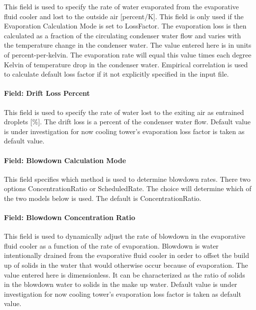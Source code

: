 This field is used to specify the rate of water evaporated from the evaporative fluid cooler and lost to the outside air {[}percent/K{]}. This field is only used if the Evaporation Calculation Mode is set to LossFactor. The evaporation loss is then calculated as a fraction of the circulating condenser water flow and varies with the temperature change in the condenser water. The value entered here is in units of percent-per-kelvin. The evaporation rate will equal this value times each degree Kelvin of temperature drop in the condenser water. Empirical correlation is used to calculate default loss factor if it not explicitly specified in the input file.

\paragraph{Field: Drift Loss Percent}\label{field-drift-loss-percent-5}

This field is used to specify the rate of water lost to the exiting air as entrained droplets {[}\%{]}. The drift loss is a percent of the condenser water flow. Default value is under investigation for now cooling tower's evaporation loss factor is taken as default value.

\paragraph{Field: Blowdown Calculation Mode}\label{field-blowdown-calculation-mode-5}

This field specifies which method is used to determine blowdown rates. There two options ConcentrationRatio or ScheduledRate. The choice will determine which of the two models below is used. The default is ConcentrationRatio.

\paragraph{Field: Blowdown Concentration Ratio}\label{field-blowdown-concentration-ratio-5}

This field is used to dynamically adjust the rate of blowdown in the evaporative fluid cooler as a function of the rate of evaporation. Blowdown is water intentionally drained from the evaporative fluid cooler in order to offset the build up of solids in the water that would otherwise occur because of evaporation. The value entered here is dimensionless. It can be characterized as the ratio of solids in the blowdown water to solids in the make up water. Default value is under investigation for now cooling tower's evaporation loss factor is taken as default value.


